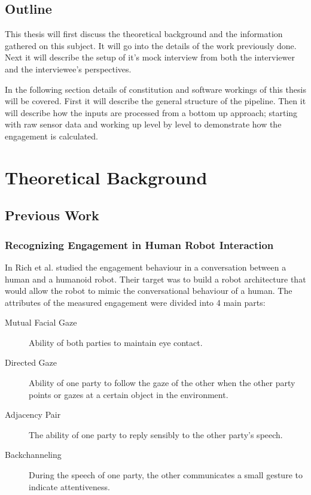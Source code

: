 \documentclass[12pt, a4paper, fleqn]{memoir}%
\begin{document}
\section{Outline}
\label{sec:Outline}
This thesis will first discuss the theoretical background and the information gathered on this subject. It will go into the details of the work previously done. Next it will describe the setup of it's mock interview from both the interviewer and the interviewee's perspectives.

In the following section details of constitution and software workings of this thesis will be covered. First it will describe the general structure of the pipeline. Then it will describe how the inputs are processed from a bottom up approach; starting with raw sensor data and working up level by level to demonstrate how the engagement is calculated.

\chapter{Theoretical Background}
\label{chap:TheoreticalBackground}

\section{Previous Work}
\label{sec:PreviousWork}

\subsection{Recognizing Engagement in Human Robot Interaction}
In \cite{rich} Rich et al. studied the engagement behaviour in a conversation between a human and a humanoid robot. Their target was to build a robot architecture that would allow the robot to mimic the conversational behaviour of a human. The attributes of the measured engagement were divided into 4 main parts:

\begin{description}
  \item[Mutual Facial Gaze] Ability of both parties to maintain eye contact.
  \item[Directed Gaze] Ability of one party to follow the gaze of the other when the other party points or gazes at a certain object in the environment.
  \item[Adjacency Pair] The ability of one party to reply sensibly to the other party's speech.
  \item[Backchanneling] During the speech of one party, the other communicates a small gesture to indicate attentiveness.
\end{description}
\end{document}

